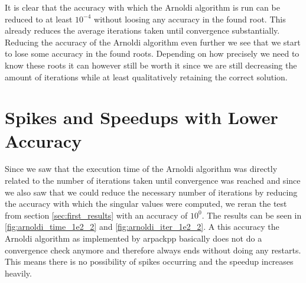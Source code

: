 \documentclass[a4paper, oneside]{discothesis}
\begin{document}
It is clear that the accuracy with which the Arnoldi algorithm is run can be reduced to at least $10^{-4}$ without loosing any accuracy in the found root.
This already reduces the average iterations taken until convergence substantially.
Reducing the accuracy of the Arnoldi algorithm even further we see that we start to lose some accuracy in the found roots.
Depending on how precisely we need to know these roots it can however still be worth it since we are still decreasing the amount of iterations while at least qualitatively retaining the correct solution.

\section{Spikes and Speedups with Lower Accuracy}
Since we saw that the execution time of the Arnoldi algorithm was directly related to the number of iterations taken until convergence was reached and since we also saw that we could reduce the necessary number of iterations by reducing the accuracy with which the singular values were computed, we reran the test from section \ref{sec:first_results} with an accuracy of $10^0$.
The results can be seen in \ref{fig:arnoldi_time_1e2_2} and \ref{fig:arnoldi_iter_1e2_2}.
A this accuracy the Arnoldi algorithm as implemented by arpackpp basically does not do a convergence check anymore and therefore always ends without doing any restarts.
This means there is no possibility of spikes occurring and the speedup increases heavily.
\end{document}
